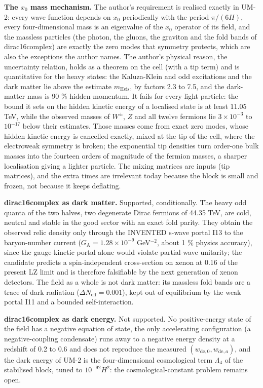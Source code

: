 \documentclass[
  10pt,
]{article}
\begin{document}
\textbf{The \(x_0\) mass mechanism.} The author's requirement is
realised exactly in UM-2: every wave function depends on \(x_0\)
periodically with the period \(\pi/(6H)\), every four-dimensional mass
is an eigenvalue of the \(x_0\) operator of its field, and the massless
particles (the photon, the gluons, the graviton and the fold bands of
dirac16complex) are exactly the zero modes that symmetry protects, which
are also the exceptions the author names. The author's physical reason,
the uncertainty relation, holds as a theorem on the cell (with a tip
term) and is quantitative for the heavy states: the Kaluza-Klein and odd
excitations and the dark matter lie above the estimate
\(m_{\mathrm{Heis}}\), by factors 2.3 to 7.5, and the dark-matter mass
is 90 \% hidden momentum. It fails for every light particle: the bound
it sets on the hidden kinetic energy of a localised state is at least
\(11.05\) TeV, while the observed masses of \(W^\pm\), \(Z\) and all
twelve fermions lie \(3\times10^{-3}\) to \(10^{-17}\) below their
estimates. Those masses come from exact zero modes, whose hidden kinetic
energy is cancelled exactly, mixed at the tip of the cell, where the
electroweak symmetry is broken; the exponential tip densities turn
order-one bulk masses into the fourteen orders of magnitude of the
fermion masses, a sharper localisation giving a lighter particle. The
mixing matrices are inputs (tip matrices), and the extra times are
irrelevant today because the block is small and frozen, not because it
keeps deflating.

\textbf{dirac16complex as dark matter.} Supported, conditionally. The
heavy odd quanta of the two halves, two degenerate Dirac fermions of
44.35 TeV, are cold, neutral and stable in the good sector with an exact
fold parity. They obtain the observed relic density only through the
INVENTED s-wave portal I13 to the baryon-number current
(\(G_{\mathrm{A}} = 1.28\times10^{-9}\) GeV\(^{-2}\), about 1 \% physics
accuracy), since the gauge-kinetic portal alone would violate
partial-wave unitarity; the candidate predicts a spin-independent
cross-section on xenon at 0.16 of the present LZ limit and is therefore
falsifiable by the next generation of xenon detectors. The field as a
whole is not dark matter: its massless fold bands are a trace of dark
radiation (\(\Delta N_{\mathrm{eff}} = 0.001\)), kept out of equilibrium
by the weak portal I11 and a bounded self-interaction.

\textbf{dirac16complex as dark energy.} Not supported. No
positive-energy state of the field has a negative equation of state, the
only accelerating configuration (a negative-coupling condensate) runs
away to a negative energy density at a redshift of 0.2 to 0.6 and does
not reproduce the measured \((w_{\mathrm{de},0}, w_{\mathrm{de},a})\),
and the dark energy of UM-2 is the four-dimensional cosmological term
\(\Lambda_4\) of the stabilised block, tuned to \(10^{-92}H^2\): the
cosmological-constant problem remains open.
\end{document}
